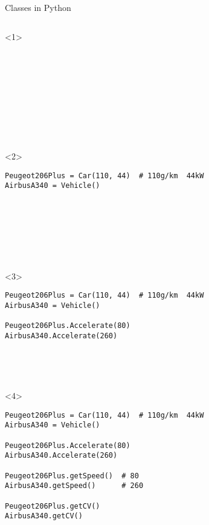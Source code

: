 
\begin{frame}[fragile]{Classes in Python}

  \begin{columns}[onlytextwidth]
    \begin{column}{\textwidth}

      \begin{onlyenv}<1>
        \begin{lstlisting}[style=python]










 \end{lstlisting}
      \end{onlyenv}

      \begin{onlyenv}<2>
        \begin{lstlisting}[style=python]
Peugeot206Plus = Car(110, 44)  # 110g/km  44kW
AirbusA340 = Vehicle()








 \end{lstlisting}
      \end{onlyenv}

      \begin{onlyenv}<3>
        \begin{lstlisting}[style=python]
Peugeot206Plus = Car(110, 44)  # 110g/km  44kW
AirbusA340 = Vehicle()

Peugeot206Plus.Accelerate(80)
AirbusA340.Accelerate(260)





 \end{lstlisting}
      \end{onlyenv}

      \begin{onlyenv}<4>
        \begin{lstlisting}[style=python]
Peugeot206Plus = Car(110, 44)  # 110g/km  44kW
AirbusA340 = Vehicle()

Peugeot206Plus.Accelerate(80)
AirbusA340.Accelerate(260)

Peugeot206Plus.getSpeed()  # 80
AirbusA340.getSpeed()      # 260

Peugeot206Plus.getCV()
AirbusA340.getCV() \end{lstlisting}
      \end{onlyenv}



\end{column}
\end{columns}
\end{frame}
